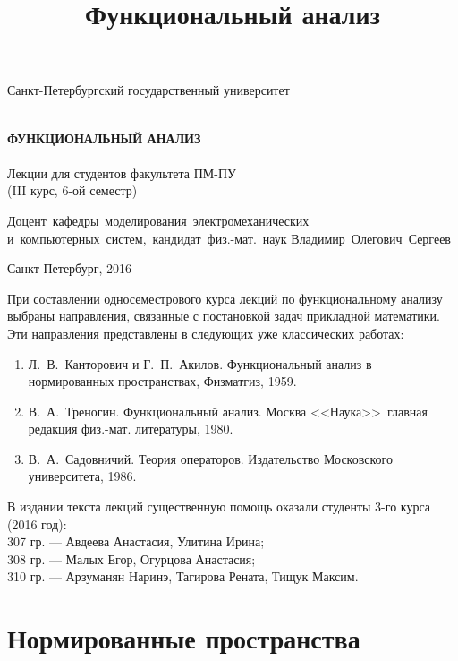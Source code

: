 \documentclass[12pt,a4paper,titlepage,oneside]{book}
\title{Функциональный анализ}
\theoremstyle{definition}
\theoremstyle{plain}
\theoremstyle{break}
\theoremstyle{remark}
\theoremstyle{remark}
\theoremstyle{remark}
\theoremstyle{remark}
\theoremstyle{plain}
\theoremstyle{plain}
\begin{document}
\begin{titlepage}
\begin{center}

\vfill

Санкт-Петербургский государственный университет\\
\ \\

\vfill

{\large\bf ФУНКЦИОНАЛЬНЫЙ АНАЛИЗ\\}
\ \\
Лекции для студентов факультета ПМ-ПУ\\
(III курс, 6-ой семестр)

\vfill

\hfill\vbox
{
\hbox{Доцент кафедры моделирования электромеханических}
\hbox{и компьютерных систем, кандидат физ.-мат. наук}
\hbox{Владимир Олегович Сергеев}
}

\vfill

Санкт-Петербург, 2016
\end{center}
\end{titlepage}

\tableofcontents
\vfill

\begin{small}
При составлении односеместрового курса лекций по функциональному анализу выбраны направления, связанные с постановкой задач прикладной математики. Эти направления представлены в следующих уже классических работах:
\begin{enumerate}
    \item Л.~В.~Канторович и Г.~П.~Акилов. Функциональный анализ в нормированных пространствах, Физматгиз, 1959.
    \item В.~А.~Треногин. Функциональный анализ. Москва <<Наука>>\, главная редакция физ.-мат. литературы, 1980.
    \item В.~А.~Садовничий. Теория операторов. Издательство Московского университета, 1986.
\end{enumerate}

В издании текста лекций существенную помощь оказали студенты 3-го курса (2016 год): \\
307 гр. --- Авдеева Анастасия, Улитина Ирина;\\
308 гр. --- Малых Егор, Огурцова Анастасия;\\
310 гр. --- Арзуманян Наринэ, Тагирова Рената, Тищук Максим.
\end{small}

\chapter{Нормированные пространства}
\end{document}
